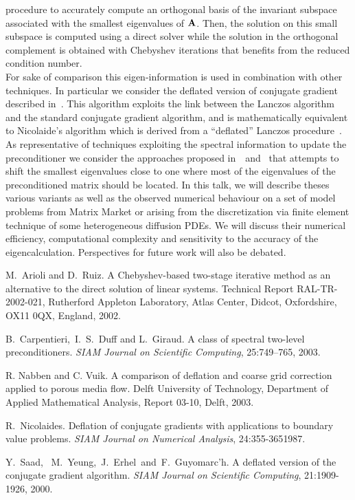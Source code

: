 \documentclass{report}
\begin{document}
procedure to accurately compute an orthogonal basis of the invariant
subspace associated with the smallest eigenvalues of ${\bf A}$.
Then, the solution on this small subspace is computed using a direct
solver while the solution in the orthogonal complement is obtained with
Chebyshev iterations that benefits from the reduced condition number.\\
For sake of comparison this eigen-information is used in combination with
other techniques.
In particular we consider the deflated version of conjugate gradient
described in~\cite{syeg:00}.
This algorithm exploits the link between the Lanczos algorithm and the
standard conjugate gradient algorithm, and is mathematically equivalent
to Nicolaide's algorithm which is derived from a ``deflated'' Lanczos
procedure~\cite{nico:87}.\\
As representative of techniques exploiting the spectral information to
update the preconditioner we consider the approaches proposed
in~\cite{cadg:03a}~and~\cite{navu:03} that attempts to shift the smallest
eigenvalues close to one where most of the eigenvalues of the
preconditioned matrix should be located.
In this talk, we will describe theses various variants as well as the
observed numerical behaviour on a set of model problems from Matrix
Market or arising from the discretization via finite element technique of
some heterogeneous diffusion PDEs.
We will discuss their numerical efficiency, computational complexity and
sensitivity to the accuracy of the eigencalculation.
Perspectives for future work will also be debated.
\begin{thebibliography}{99}
{M.~Arioli and D.~Ruiz}.
{A {C}hebyshev-based two-stage iterative method as an alternative to the
direct solution of linear systems}.
{Technical Report RAL-TR-2002-021, Rutherford Appleton Laboratory, Atlas
Center, Didcot, Oxfordshire, OX11 0QX, England, 2002}.

{B.~Carpentieri,~I.~S.~Duff and L.~Giraud}.
{A class of spectral two-level preconditioners}.
{\em SIAM {J}ournal on {S}cientific {C}omputing}, 25:{749--765}, 2003.

{R. Nabben and C. Vuik}.
{A comparison of deflation and coarse grid correction applied to porous media flow}.
{Delft University of Technology, Department of Applied Mathematical
Analysis}, {Report 03-10}, {Delft}, 2003.

{R.~Nicolaides}.
{Deflation of conjugate gradients with applications to boundary value problems}.
{\em SIAM Journal on Numerical Analysis}, 24:{355-365}1987.

{Y.~Saad,~ M.~Yeung,~J.~Erhel~and~F.~Guyomarc'h}.
{A deflated version of the conjugate gradient algorithm}.
{\em SIAM Journal on Scientific Computing}, 21:{1909-1926}, 2000.
\end{thebibliography}
\end{document}
